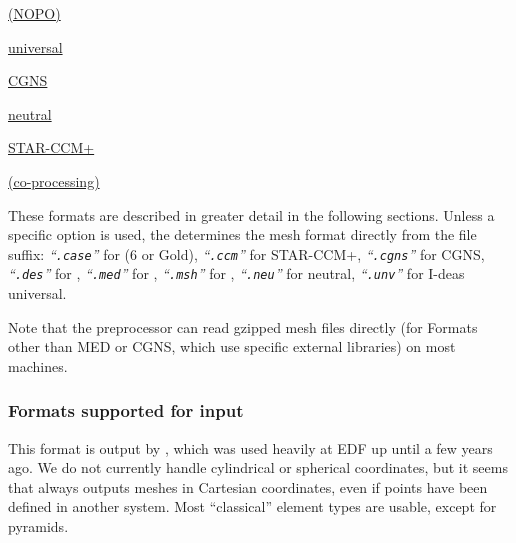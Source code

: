 {{{\begin{list}{-}{}

\item \hyperref[sec:fmtdesc_des]{\simail (NOPO)}
\item \hyperref[sec:fmtdesc_unv]{\ideas universal}
\item \hyperref[sec:fmtdesc_med]{\med}
\item \hyperref[sec:fmtdesc_cgns]{CGNS}
\item \hyperref[sec:fmtdesc_ensight6]{}
\item \hyperref[sec:fmtdesc_ensightg]{\ensightg}
\item \hyperref[sec:fmtdesc_neu]{\gambit neutral}
\item \hyperref[sec:fmtdesc_gmsh]{\gmsh}
\item \hyperref[sec:fmtdesc:ccm]{STAR-CCM+}
\item \hyperref[sec:fmtdesc_catalyst]{\catalyst (co-processing)}
\end{list}

These formats are described in greater detail in the following sections.
Unless a specific option is used, the \pcs determines the mesh format directly
from the file suffix: %
{\em``\texttt{.case}''} for \ensight (6 or Gold),
{\em``\texttt{.ccm}''} for STAR-CCM+,
{\em``\texttt{.cgns}''} for CGNS,
{\em``\texttt{.des}''} for \simail,
{\em``\texttt{.med}''} for \med,
{\em``\texttt{.msh}''} for \gmsh,
{\em``\texttt{.neu}''} for \gambit neutral,
{\em``\texttt{.unv}''} for I-deas universal.

Note that the preprocessor can read gzipped mesh files directly (for Formats
other than MED or CGNS, which use specific external libraries) on most machines.

\subsubsection{Formats supported for input\label{sec:formats_in}}


This format is output by \simail, which was used heavily at EDF up until
a few years ago. We do not
currently handle cylindrical or spherical coordinates, but it seems that
\simail always outputs meshes in Cartesian coordinates, even if points
have been defined in another system. Most ``classical'' element types
are usable, except for pyramids.

}}}
